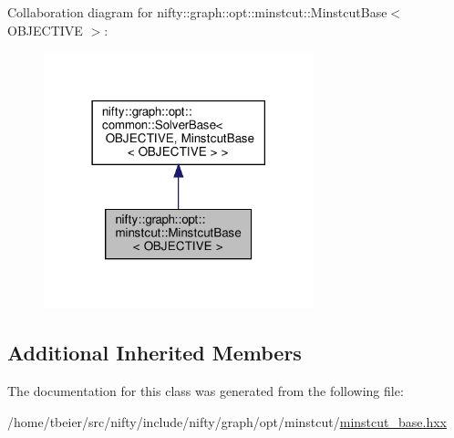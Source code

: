 Collaboration diagram for nifty\+:\+:graph\+:\+:opt\+:\+:minstcut\+:\+:Minstcut\+Base$<$ O\+B\+J\+E\+C\+T\+I\+VE $>$\+:
\nopagebreak
\begin{figure}[H]
\begin{center}
\leavevmode
\includegraphics[width=222pt]{classnifty_1_1graph_1_1opt_1_1minstcut_1_1MinstcutBase__coll__graph}
\end{center}
\end{figure}
\subsection*{Additional Inherited Members}


The documentation for this class was generated from the following file\+:\begin{DoxyCompactItemize}
\item 
/home/tbeier/src/nifty/include/nifty/graph/opt/minstcut/\hyperlink{minstcut__base_8hxx}{minstcut\+\_\+base.\+hxx}\end{DoxyCompactItemize}
